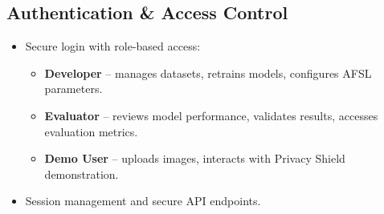 \documentclass[a4paper,12pt]{article}
\begin{document}
\subsection{Authentication \& Access Control}
\begin{itemize}
    \item Secure login with role-based access:
    \begin{itemize}
        \item \textbf{Developer} – manages datasets, retrains models, configures AFSL parameters.
        \item \textbf{Evaluator} – reviews model performance, validates results, accesses evaluation metrics.
        \item \textbf{Demo User} – uploads images, interacts with Privacy Shield demonstration.
    \end{itemize}
    \item Session management and secure API endpoints.
\end{itemize}
\end{document}
